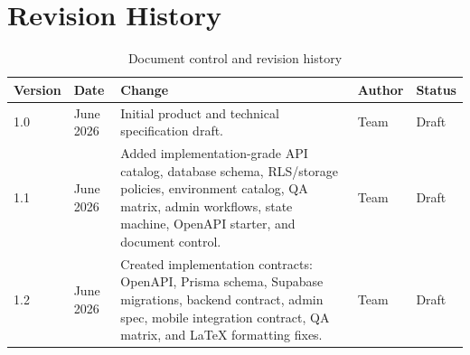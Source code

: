 \chapter{Revision History}
\begin{longtable}{p{}p{}p{}p{}p{}}
\caption{Document control and revision history}\\
\toprule
Version & Date & Change & Author & Status \\
\midrule
1.0 & June 2026 & Initial product and technical specification draft. & Team & Draft \\
1.1 & June 2026 & Added implementation-grade API catalog, database schema, RLS/storage policies, environment catalog, QA matrix, admin workflows, state machine, OpenAPI starter, and document control. & Team & Draft \\
1.2 & June 2026 & Created implementation contracts: OpenAPI, Prisma schema, Supabase migrations, backend contract, admin spec, mobile integration contract, QA matrix, and LaTeX formatting fixes. & Team & Draft \\
\bottomrule
\end{longtable}
